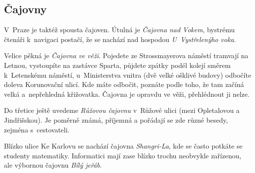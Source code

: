 \subsection{Čajovny}

V~Praze je taktéž spousta čajoven. Útulná je {\it Čajovna nad Vokem},
bystrému čtenáři k~navigaci postačí, že se nachází nad hospodou {\it
U~Vystřelenýho voka}.

Velice pěkná je {\it Čajovna ve věži}. Pojedete ze Strossmayerova
náměstí tramvají na Letnou, vystoupíte na zastávce Sparta, půjdete
zpátky podél kolejí směrem k~Letenskému náměstí, u~Ministerstva
vnitra (dvě velké ošklivé budovy) odbočíte doleva Korunovační
ulicí. Kde máte odbočit, poznáte podle toho, že tam začíná velká
a~nepřehledná křižovatka. Čajovna je opravdu ve věži, přehlédnout
ji nelze.

Do třetice ještě uvedeme {\it Růžovou čajovnu\/} v~Růžové ulici (mezi
Opletalovou a Jindřišskou). Je poměrně známá, příjemná a pořádají se zde
různé besedy, zejména s~cestovateli.

Blízko ulice Ke Karlovu se nachází čajovna {\it Shangri-La}, kde se často potkáte se studenty matematiky. Informatici mají zase blízko trochu neobvykle zařízenou, ale výbornou čajovnu {\it Bílý jeřáb}.
